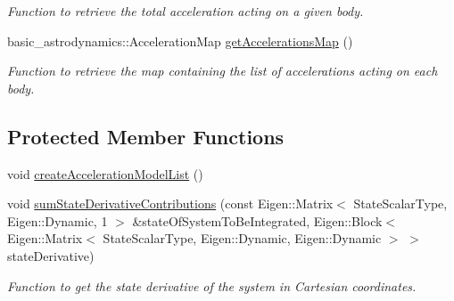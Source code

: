 \begin{DoxyCompactItemize}
\begin{DoxyCompactList}\small\item\em Function to retrieve the total acceleration acting on a given body. \end{DoxyCompactList}\item 
basic\+\_\+astrodynamics\+::\+Acceleration\+Map \hyperlink{classtudat_1_1propagators_1_1NBodyStateDerivative_a3c8a3939cf0e2a6b2ea1c23e44196ac7}{get\+Accelerations\+Map} ()
\begin{DoxyCompactList}\small\item\em Function to retrieve the map containing the list of accelerations acting on each body. \end{DoxyCompactList}\end{DoxyCompactItemize}
\subsection*{Protected Member Functions}
\begin{DoxyCompactItemize}
\item 
void \hyperlink{classtudat_1_1propagators_1_1NBodyStateDerivative_a107c7354c39b9793ddee9eb6b363a4da}{create\+Acceleration\+Model\+List} ()
\item 
void \hyperlink{classtudat_1_1propagators_1_1NBodyStateDerivative_a9dc88981ebb90ecf8f7673760d321597}{sum\+State\+Derivative\+Contributions} (const Eigen\+::\+Matrix$<$ State\+Scalar\+Type, Eigen\+::\+Dynamic, 1 $>$ \&state\+Of\+System\+To\+Be\+Integrated, Eigen\+::\+Block$<$ Eigen\+::\+Matrix$<$ State\+Scalar\+Type, Eigen\+::\+Dynamic, Eigen\+::\+Dynamic $>$ $>$ state\+Derivative)
\begin{DoxyCompactList}\small\item\em Function to get the state derivative of the system in Cartesian coordinates. \end{DoxyCompactList}\end{DoxyCompactItemize}

